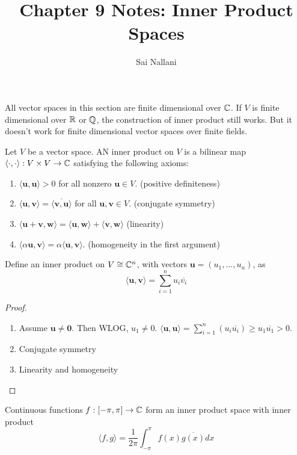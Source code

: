 \documentclass{scrartcl}
\title{Chapter 9 Notes: Inner Product Spaces}
\author{Sai Nallani}
\newcommand{\bv}{\mathbf{v}}
\newcommand{\bu}{\mathbf{u}}
\newcommand{\la}{\langle}
\newcommand{\ra}{\rangle}
\newcommand{\angb}[1]{\langle #1 \rangle}
\begin{document}
\maketitle

All vector spaces in this section are finite dimensional over $\mathbb C$. If $V$ is
finite dimensional over $\mathbb R$ or $\mathbb Q$, the construction of inner product still works.
But it doesn't work for finite dimensional vector spaces over finite fields.

\begin{definition}
    Let $V$ be a vector space. AN inner product on $V$ is a bilinear map $\la \cdot, \cdot
        \ra: V \times V \to \CC$ satisfying the following axioms:
    \begin{enumerate}
        \item $\la \bu, \bu \ra > 0$ for all nonzero $\bu \in V$. (positive
              definiteness)
        \item $\la \bu, \bv \ra = \overline{\la \bv, \bu \ra}$ for all $\bu, \bv \in V$.
              (conjugate symmetry)
        \item $\angb{\bu+\bv, \mathbf{w}} = \angb{\bu, \mathbf{w}} + \angb{\bv, \mathbf{w}}$
              (linearity)
        \item $\angb{\alpha \bu, \bv} = \alpha \angb{\bu, \bv}$. (homogeneity in the
              first argument)
    \end{enumerate}
\end{definition}

Define an inner product on $V \cong \mathbb C^n$, with vectors $\bu = (u_1, \dots, u_n)$, as
\[\angb{\bu,\bv} = \sum_{i=1}^{n}{u_i\overline{v_i}}\]
\begin{proof}
    \begin{enumerate}
        \item Assume $\bu \neq \mathbf{0}$. Then WLOG, $u_1 \neq 0$. $\angb{\bu, \bu} =
                  \sum_{i=1}^{n}(u_i\overline{u_i}) \geq u_1\overline{u_1} > 0$.
        \item Conjugate symmetry
        \item Linearity and homogeneity
    \end{enumerate}
\end{proof}

\begin{example}
    Continuous functions $f: [-\pi, \pi] \to \mathbb C$ form an inner product space with inner
    product
    \[ \angb{f, g} = \frac{1}{2\pi}\int_{-\pi}^{\pi}{f(x)\overline{g(x)}dx}\]
\end{example}
\end{document}
